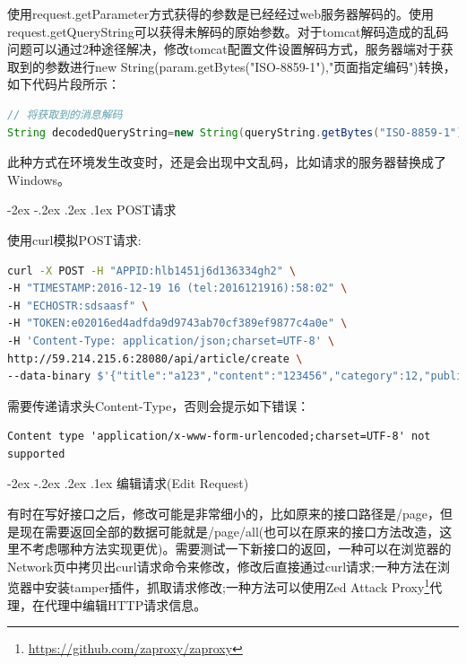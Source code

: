 \documentclass[12pt]{book}
\makeatletter
\numberwithin{dummy}{section}
\theoremstyle{ocrenumbox}
\theoremstyle{blacknumex}
\theoremstyle{blacknumbox}
\theoremstyle{ocrenum}
\renewcommand\paragraph{\@startsection{paragraph}{4}{\z@}
	{-2ex \@plus-.2ex \@minus .2ex}
	{.1ex}
	{\normalfont\small\sffamily\bfseries}}
\makeatother
\begin{document}
使用request.getParameter方式获得的参数是已经经过web服务器解码的。使用request.getQueryString可以获得未解码的原始参数。对于tomcat解码造成的乱码问题可以通过2种途径解决，修改tomcat配置文件设置解码方式，服务器端对于获取到的参数进行new String(param.getBytes("ISO-8859-1"),"页面指定编码")转换，如下代码片段所示：

\begin{lstlisting}[language=Java]
// 将获取到的消息解码
String decodedQueryString=new String(queryString.getBytes("ISO-8859-1"),"UTF-8");
\end{lstlisting}

此种方式在环境发生改变时，还是会出现中文乱码，比如请求的服务器替换成了Windows。

\paragraph{POST请求}

使用curl模拟POST请求:

\begin{lstlisting}[language=Bash]
curl -X POST -H "APPID:hlb1451j6d136334gh2" \
-H "TIMESTAMP:2016-12-19 16 (tel:2016121916):58:02" \
-H "ECHOSTR:sdsaasf" \
-H "TOKEN:e02016ed4adfda9d9743ab70cf389ef9877c4a0e" \
-H 'Content-Type: application/json;charset=UTF-8' \
http://59.214.215.6:28080/api/article/create \
--data-binary $'{"title":"a123","content":"123456","category":12,"publisher":"ab"}'|jq '.'
\end{lstlisting}

需要传递请求头Content-Type，否则会提示如下错误：

\begin{lstlisting}
Content type 'application/x-www-form-urlencoded;charset=UTF-8' not supported
\end{lstlisting}

\paragraph{编辑请求(Edit Request)}

有时在写好接口之后，修改可能是非常细小的，比如原来的接口路径是/page，但是现在需要返回全部的数据可能就是/page/all(也可以在原来的接口方法改造，这里不考虑哪种方法实现更优)。需要测试一下新接口的返回，一种可以在浏览器的Network页中拷贝出curl请求命令来修改，修改后直接通过curl请求;一种方法在浏览器中安装tamper插件，抓取请求修改;一种方法可以使用Zed Attack Proxy\footnote{\url{https://github.com/zaproxy/zaproxy}}代理，在代理中编辑HTTP请求信息。
\end{document}
